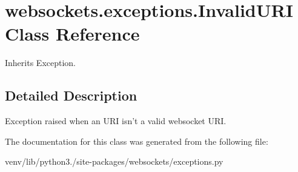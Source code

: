 \hypertarget{classwebsockets_1_1exceptions_1_1_invalid_u_r_i}{}\section{websockets.\+exceptions.\+Invalid\+U\+RI Class Reference}
\label{classwebsockets_1_1exceptions_1_1_invalid_u_r_i}


Inherits Exception.



\subsection{Detailed Description}
\begin{DoxyVerb}Exception raised when an URI isn't a valid websocket URI.\end{DoxyVerb}
 

The documentation for this class was generated from the following file\+:\begin{DoxyCompactItemize}
\item 
venv/lib/python3./site-\/packages/websockets/exceptions.\+py\end{DoxyCompactItemize}
